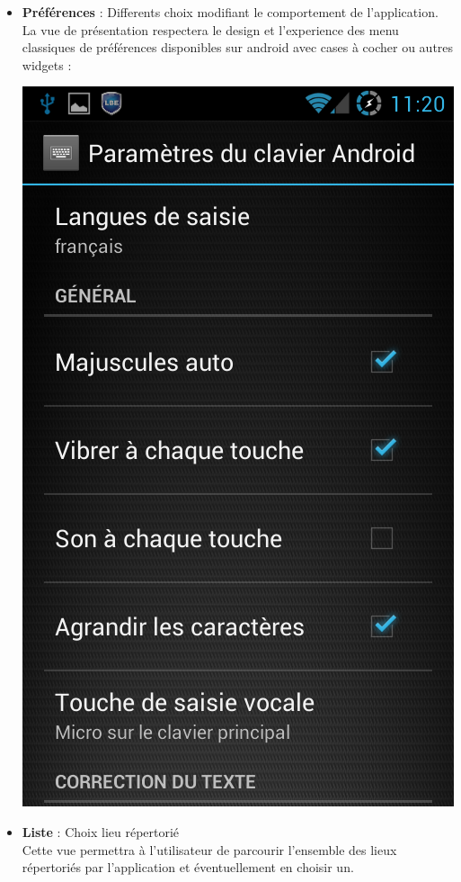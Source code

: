 \documentclass{article}
\begin{document}
\begin{itemize}
\begin{center}
		\end{center}
	\item \textbf{Préférences} : Differents choix modifiant le comportement de l'application. \\
	La vue de présentation respectera le design et l'experience des menu classiques de préférences disponibles sur android avec cases à cocher ou autres widgets :
		\begin{center}
			\includegraphics[scale=0.35]{preferences.png}
		\end{center}
	\item \textbf{Liste} : Choix lieu répertorié \\
	Cette vue permettra à l'utilisateur de parcourir l'ensemble des lieux répertoriés par l'application et éventuellement en choisir un.
	\end{itemize}
	
\end{document}
